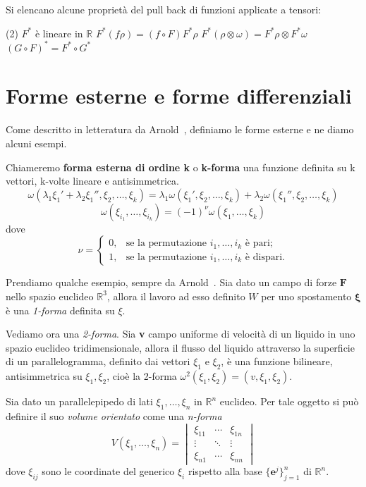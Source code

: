 \begin{property} Si elencano alcune proprietà del pull back di funzioni applicate a tensori:
    \begin{tasks}[label=\arabic*.](2)
        \task $F^*$ è lineare in $\mathbb{R}$
        \task $F^*(f \rho) = (f \circ F) F^* \rho$
        \task $F^* (\rho \otimes \omega) = F^* \rho \otimes F^* \omega$
        \task $(G \circ F)^* = F^* \circ G^*$
    \end{tasks}
\end{property}

\section{Forme esterne e forme differenziali}

Come descritto in letteratura da Arnold~\cite{arnold_meccanica}, definiamo le forme esterne e ne diamo alcuni esempi.

\begin{definition}
    Chiameremo \textbf{forma esterna di ordine k} o \textbf{k-forma} una funzione definita su k vettori, k-volte lineare e antisimmetrica.
    \[
        \omega(\lambda_1 \xi_1' + \lambda_2 \xi_1'', \xi_2, \dots, \xi_k) = \lambda_1 \omega(\xi_1', \xi_2, \dots, \xi_k) + \lambda_2 \omega(\xi_1'', \xi_2, \dots, \xi_k)
    \]
    \[
        \omega(\xi_{i_1}, \dots, \xi_{i_k}) = (-1)^\nu \omega(\xi_1, \dots, \xi_k)
    \]
    dove
    \[
        \nu = \begin{cases}
            0, & \text{se la permutazione } i_1, \dots, i_k \text{ è pari;}    \\
            1, & \text{se la permutazione } i_1, \dots, i_k \text{ è dispari.}
        \end{cases}
    \]
\end{definition}
Prendiamo qualche esempio, sempre da Arnold~\cite{arnold_meccanica}.
Sia dato un campo di forze $\mathbf{F}$ nello spazio euclideo $\mathbb{R}^3$, allora il lavoro ad esso definito $W$ per uno spostamento $\mathbf{\xi}$ è una \textit{1-forma} definita su $\xi$.

Vediamo ora una \textit{2-forma}.
Sia \textbf{v} campo uniforme di velocità di un liquido in uno spazio euclideo tridimensionale, allora il flusso del liquido attraverso la superficie di un parallelogramma, definito dai vettori $\xi_1$ e $\xi_2$, è una funzione bilineare, antisimmetrica su $\xi_1, \xi_2$, cioè la 2-forma $\omega^2(\xi_1, \xi_2) = (v, \xi_1, \xi_2)$.

Sia dato un parallelepipedo di lati $\xi_1, \dots, \xi_n$ in $\mathbb{R}^n$ euclideo. Per tale oggetto si può definire il suo \textit{volume orientato} come una \textit{n-forma}
\[
    V(\xi_1, \dots, \xi_n) =
    \begin{vmatrix}
        \xi_{11} & \cdots & \xi_{1n} \\
        \vdots   & \ddots & \vdots   \\
        \xi_{n1} & \cdots & \xi_{nn}
    \end{vmatrix}
\]
dove $\xi_{ij}$ sono le coordinate del generico $\xi_i$ rispetto alla base $\{\mathbf{e}^j\}_{j=1}^n$ di $\mathbb{R}^n $.


